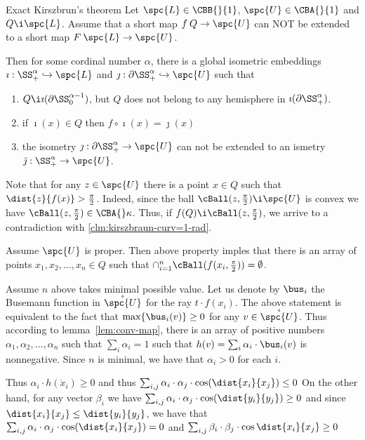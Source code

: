 {\begin{thm}{Exact Kirszbrun's theorem}\label{clm:kirszbraun-curv=1}
Let $\spc{L}\in\CBB{}{1}$, 
$\spc{U}\in\CBA{}{1}$ 
and $Q\i \spc{L}$.
Assume that a short map $f\:Q\to \spc{U}$ can NOT be extended to a short map 
$F\:\spc{L}\to \spc{U}$.

Then for some cordinal number $\alpha$, there is a global isometric embeddings $\imath:\SS^\alpha_+\hookrightarrow \spc{L}$ and $\jmath:\partial\SS^\alpha_+\hookrightarrow \spc{U}$ such that
\begin{enumerate}
\item $Q\i \imath(\partial\SS^{\alpha-1}_0)$, but $Q$ does not belong to any hemisphere in $\imath(\partial\SS^{\alpha}_+)$.
\item if $\imath(x)\in Q$ then $f\circ\imath(x)=\jmath(x)$ 
\item the isometry $\jmath:\partial\SS^\alpha_+\to \spc{U}$ can not be extended to an ismetry $\bar\jmath:\SS^\alpha_+\to \spc{U}$.
\end{enumerate}
\end{thm}

 Note that for any $z\in \spc{U}$ there is a point $x\in Q$ such that $\dist{z}{f(x)}>\tfrac\pi2$.
Indeed, since the ball $\cBall(z,\tfrac\pi2)\i \spc{U}$ is convex we have $\cBall(z,\tfrac\pi2)\in \CBA{}\kappa$.
Thus, if $f(Q)\i \cBall(z,\tfrac\pi2)$, we arrive to a contradiction with \ref{clm:kirszbraun-curv=1-rad}.

Assume $\spc{U}$ is proper.
Then above property imples that there is an array of points $x_1,x_2,\dots, x_n\in Q$ such that
$\cap_{i=1}^n\cBall(f(x_i,\tfrac\pi2))=\emptyset$.

Assume $n$ above takes minimal possible value.
Let us denote by $\bus_i$ the Busemann function in $\mathring{\spc{U}}$ for the ray $t\cdot f(x_i)$.
The above statement is equivalent to the fact that $\max\{\bus_i(v)\}\ge0$ for any $v\in \mathring{\spc{U}}$.
Thus according to lemma~\ref{lem:conv-map}, there is an array of positive numbers $\alpha_1,\alpha_2,\dots,\alpha_n$ 
such that $\sum_i\alpha_i=1$ such that $h(v)=\sum_i\alpha_i\cdot\bus_i(v)$ is nonnegative.
Since $n$ is minimal, we have that $\alpha_i>0$ for each $i$.

Thus $\alpha_i\cdot h(\mathring{x}_i)\ge 0$ and thus
$\sum_{i,j}\alpha_i\cdot\alpha_j\cdot\cos(\dist{x_i}{x_j})\le 0$
On the other hand, for any vector $\beta_i$ we have 
$\sum_{i,j}\alpha_i\cdot\alpha_j\cdot\cos(\dist{y_i}{y_j})\ge 0$ and since
$\dist{x_i}{x_j}\le\dist{y_i}{y_j}$, we have that $\sum_{i,j}\alpha_i\cdot\alpha_j\cdot\cos(\dist{x_i}{x_j})=0$ and $\sum_{i,j}\beta_i\cdot\beta_j\cdot\cos\dist{x_i}{x_j}\ge0$



}
